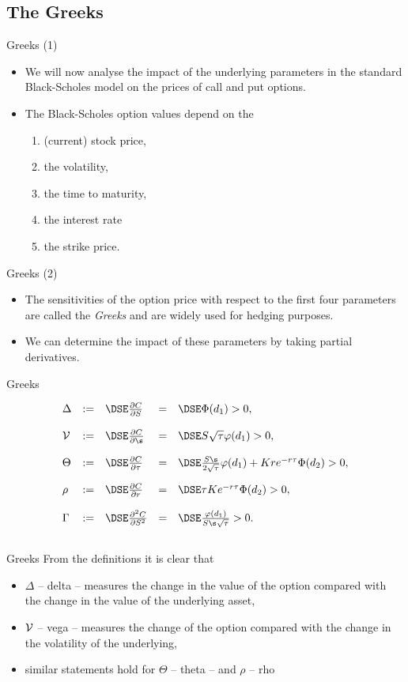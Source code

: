 \subsection{The Greeks}

{Greeks (1)}
\begin{itemize}
\item<1-> We will now analyse the impact of the
underlying parameters in the standard Black-Scholes model on the
prices of call and put options.
\item<2->
The Black-Scholes option values
depend on the
\begin{enumerate}
\item (current) stock price,
\item the volatility,
\item the time to maturity,
\item the interest rate
\item the strike price.
\end{enumerate}
\end{itemize}


{Greeks (2)}
\begin{itemize}
\item<1-> The
sensitivities of the option price with respect to the first four
parameters are called the {\it Greeks} and are widely used for
hedging purposes.
\item<1->
We can determine the impact of these parameters
by taking partial derivatives.
\end{itemize}


{Greeks}

$$
\begin{array}{lllll}
\Delta &:=&\DSE \frac{\partial C}{\partial S} &=&\DSE \Phi(d_1) >
0,\\*[12pt]
{\cal V} &:=&\DSE \frac{\partial C}{\partial \s} &=&
\DSE S \sqrt{\tau} \varphi(d_1) >0,\\*[12pt]
 \Theta &:=&\DSE \frac{\partial
C}{\partial \tau} &=& \DSE \frac{S \s}{2 \sqrt{\tau}} \varphi(d_1) + K r
e^{-r\tau} \Phi(d_2) >0,\\*[12pt]
\rho &:=&\DSE \frac{\partial
C}{\partial r} &=& \DSE \tau K e^{-r\tau} \Phi(d_2) >0,\\*[12pt] \Gamma
&:=&\DSE \frac{\partial^2 C}{\partial S^2} &=& \DSE
\frac{\varphi(d_1)}{S \s \sqrt{\tau}} >0.\\*[12pt]
\end{array}
$$

{Greeks} From the definitions it is clear that
\begin{itemize}
\item<1->
$\Delta$ -- delta -- measures the change in the value of the
option compared with the change in the value of the underlying
asset,
\item<2-> ${\cal V}$ -- vega -- measures the change of the option
compared with the change in the volatility of the underlying,
\item<3-> similar statements hold for $\Theta$ -- theta -- and $\rho$ -- rho
\end{itemize}


